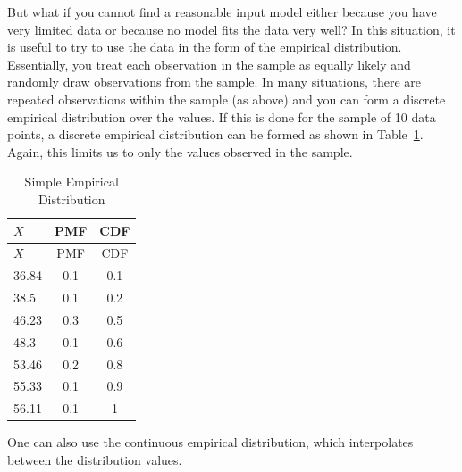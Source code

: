 \documentclass[
]{book}
\theoremstyle{definition}
\theoremstyle{definition}
\theoremstyle{definition}
\theoremstyle{definition}
\theoremstyle{remark}
\begin{document}
But what if you cannot find a reasonable input model either because you
have very limited data or because no model fits the data very well? In
this situation, it is useful to try to use the data in the form of the
empirical distribution. Essentially, you treat each observation in the
sample as equally likely and randomly draw observations from the sample.
In many situations, there are repeated observations within the sample
(as above) and you can form a discrete empirical distribution over the
values. If this is done for the sample of 10 data points, a discrete
empirical distribution can be formed as shown in
Table~\ref{tab:SimpleEmpDist}. Again, this limits us to only the values observed in the sample.

\hypertarget{tab:SimpleEmpDist}{}
\begin{longtable}[]{@{}lcc@{}}
\caption{\label{tab:SimpleEmpDist} Simple Empirical Distribution}\tabularnewline
\toprule
\(X\) & PMF & CDF \\
\midrule
\endfirsthead
\toprule
\(X\) & PMF & CDF \\
\midrule
\endhead
36.84 & 0.1 & 0.1 \\
38.5 & 0.1 & 0.2 \\
46.23 & 0.3 & 0.5 \\
48.3 & 0.1 & 0.6 \\
53.46 & 0.2 & 0.8 \\
55.33 & 0.1 & 0.9 \\
56.11 & 0.1 & 1 \\
\bottomrule
\end{longtable}

One can also use the continuous empirical distribution, which
interpolates between the distribution values.
\end{document}
